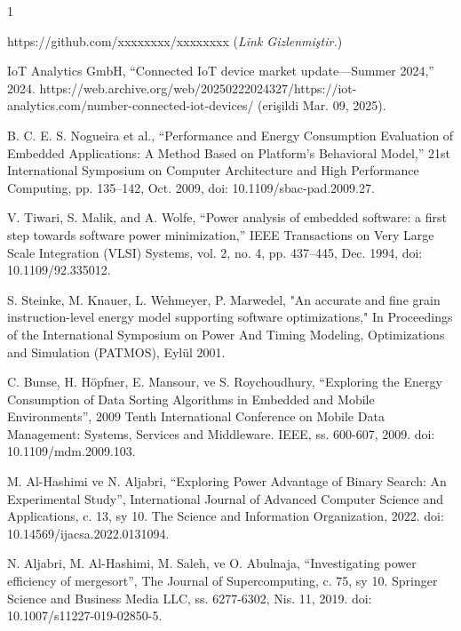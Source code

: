 \documentclass[conference, a4paper]{IEEEtran}
\begin{document}
\begin{thebibliography}{1}

https://github.com/xxxxxxxx/xxxxxxxx (\textit{Link Gizlenmiştir.})

IoT Analytics GmbH, “Connected IoT device market update—Summer 2024,” 2024. https://web.archive.org/web/20250222024327/https://iot-analytics.com/number-connected-iot-devices/ (erişildi Mar. 09, 2025).

B. C. E. S. Nogueira et al., “Performance and Energy Consumption Evaluation of Embedded Applications: A Method Based on Platform’s Behavioral Model,” 21st International Symposium on Computer Architecture and High Performance Computing, pp. 135–142, Oct. 2009, doi: 10.1109/sbac-pad.2009.27.

V. Tiwari, S. Malik, and A. Wolfe, “Power analysis of embedded software: a first step towards software power minimization,” IEEE Transactions on Very Large Scale Integration (VLSI) Systems, vol. 2, no. 4, pp. 437–445, Dec. 1994, doi: 10.1109/92.335012.

S. Steinke, M. Knauer, L. Wehmeyer, P. Marwedel, "An accurate and
fine grain instruction-level energy model supporting software optimizations," In Proceedings of the International Symposium on Power And Timing Modeling, Optimizations and Simulation (PATMOS), Eylül 2001.

C. Bunse, H. Höpfner, E. Mansour, ve S. Roychoudhury, “Exploring the Energy Consumption of Data Sorting Algorithms in Embedded and Mobile Environments”, 2009 Tenth International Conference on Mobile Data Management: Systems, Services and Middleware. IEEE, ss. 600-607, 2009. doi: 10.1109/mdm.2009.103. 

M. Al-Hashimi ve N. Aljabri, “Exploring Power Advantage of Binary Search: An Experimental Study”, International Journal of Advanced Computer Science and Applications, c. 13, sy 10. The Science and Information Organization, 2022. doi: 10.14569/ijacsa.2022.0131094.

N. Aljabri, M. Al-Hashimi, M. Saleh, ve O. Abulnaja, “Investigating power efficiency of mergesort”, The Journal of Supercomputing, c. 75, sy 10. Springer Science and Business Media LLC, ss. 6277-6302, Nis. 11, 2019. doi: 10.1007/s11227-019-02850-5. 


\end{thebibliography}
\end{document}

